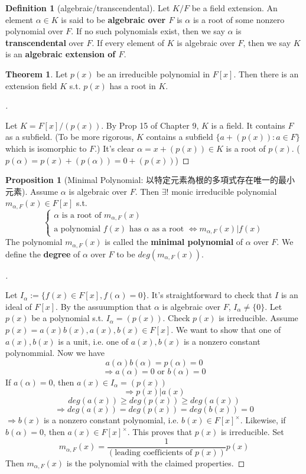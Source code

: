 \documentclass[12pt]{article}
\theoremstyle{definition}
\newtheorem{thm}{Theorem}
\newtheorem{dfn}{Definition}
\newtheorem{prop}{Proposition}
\newenvironment{proofs}[1][\proofname]{%
  \begin{proof}[#1]$ $\par\nobreak\ignorespaces
}{%
  \end{proof}
}
\begin{document}
\begin{dfn}[algebraic/transcendental]
	Let $K/F$ be a field extension. An element $\alpha \in K$ is said to be \textbf{algebraic over $F$} is $\alpha$ is a root of some nonzero polynomial over $F$.
	If no such polynomials exist, then we say $\alpha$ is \textbf{transcendental} over $F$.
	If every element of $K$ is algebraic over $F$, then we say $K$ is an \textbf{algebraic extension of $F$}.
\end{dfn}

\begin{thm}
	Let $p(x)$ be an irreducible polynomial in $F[x]$. Then there is an extension field $K$ s.t. $p(x)$ has a root in $K$.
\end{thm}

\begin{proofs}
	Let $K = F[x]/(p(x))$.
	By Prop 15 of Chapter 9, $K$ is a field.
	It contains $F$ as a subfield.
	(To be more rigorous, $K$ contains a subfield $\{a + (p(x)): a \in F\}$ which is isomorphic to $F$.)
	It's clear $\alpha = x + (p(x)) \in K$ is a root of $p(x)$.
	($p(\alpha) = p(x) + (p(\alpha)) = 0 + (p(x))$)
\end{proofs}

\begin{prop}[Minimal Polynomial: 以特定元素為根的多項式存在唯一的最小元素]
	Assume $\alpha$ is algebraic over $F$.
	Then $\exists !$ monic irreducible polynomial $m_{\alpha, F}(x) \in F[x]$ s.t.
	\[
		\begin{cases}
			\alpha \text{ is a root of } m_{\alpha, F}(x) \\
			\text{a polynomial } f(x) \text{ has } \alpha \text{ as a root } \Leftrightarrow m_{\alpha, F}(x) | f(x)
		\end{cases}
	\]
	The polynomial $m_{\alpha, F}(x)$ is called the \textbf{minimal polynomial} of $\alpha$ over $F$.
	We define the \textbf{degree} of $\alpha$ over $F$ to be $deg(m_{\alpha, F}(x))$.
\end{prop}

\begin{proofs}
	Let $I_\alpha := \{f(x) \in F[x], f(\alpha) = 0\}$.
	It's straightforward to check that $I$ is an ideal of $F[x]$.
	By the assuumption that $\alpha$ is algebraic over $F$, $I_\alpha \neq \{0\}$.
	Let $p(x)$ be a polynomial s.t. $I_\alpha = (p(x))$.
	Check $p(x)$ is irreducible.
	Assume $p(x) = a(x) b(x), a(x), b(x) \in F[x]$.
	We want to show that one of $a(x), b(x)$ is a unit, i.e. one of $a(x), b(x)$ is a nonzero constant polynommial.
	Now we have
	\[
		a(\alpha) b(\alpha) = p(\alpha) = 0
	\]
	\[
		\Rightarrow a(\alpha) = 0 \text{ or } b(\alpha) = 0
	\]
	If $a(\alpha) = 0$, then $a(x) \in I_\alpha = (p(x))$
	\[
		\Rightarrow p(x) | a(x)
	\]
	\[
		deg(a(x)) \geq deg(p(x)) \geq deg(a(x))
	\]
	\[
		\Rightarrow deg(a(x)) = deg(p(x)) = deg(b(x)) = 0
	\]
	$\Rightarrow b(x)$ is a nonzero constant polynomial, i.e. $b(x) \in F[x]^\times$.
	Likewise, if $b(\alpha) = 0$, then $a(x) \in F[x]^\times$.
	This proves that $p(x)$ is irreducible.
	Set
	\[
		m_{\alpha, F}(x) = \frac{1}{(\text{leading coefficients of }p(x))} p(x)
	\]
	Then $m_{\alpha, F}(x)$ is the polynomial with the claimed properties.
\end{proofs}
\end{document}
